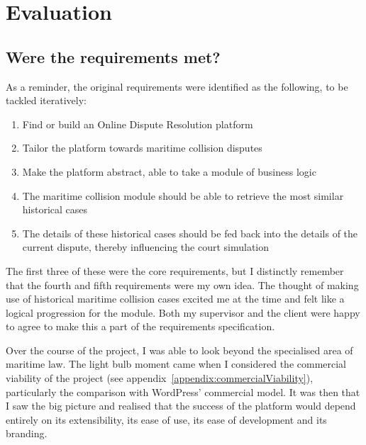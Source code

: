 \chapter{Evaluation}

\section{Were the requirements met?}

As a reminder, the original requirements were identified as the following, to be tackled iteratively:

\begin{enumerate}

    \item Find or build an Online Dispute Resolution platform
    
    \item Tailor the platform towards maritime collision disputes

    \item Make the platform abstract, able to take a module of business logic
    
    \item The maritime collision module should be able to retrieve the most similar historical cases

    \item The details of these historical cases should be fed back into the details of the current dispute, thereby influencing the court simulation

\end{enumerate}

The first three of these were the core requirements, but I distinctly remember that the fourth and fifth requirements were my own idea. The thought of making use of historical maritime collision cases excited me at the time and felt like a logical progression for the module. Both my supervisor and the client were happy to agree to make this a part of the requirements specification.

Over the course of the project, I was able to look beyond the specialised area of maritime law. The light bulb moment came when I considered the commercial viability of the project (see appendix~\ref{appendix:commercialViability}), particularly the comparison with WordPress' commercial model. It was then that I saw the big picture and realised that the success of the platform would depend entirely on its extensibility, its ease of use, its ease of development and its branding.

